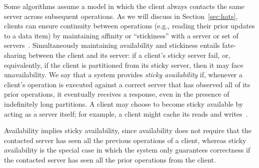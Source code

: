 Some algorithms assume a model in which the client always contacts the
same server across subsequent operations. As we will discuss in
Section~\ref{sec:hats}, clients can ensure continuity between
operations (e.g., reading their prior updates to a data item) by
maintaining affinity or ``stickiness'' with a server or set of
servers~\cite{vogels-defs}. Simultaneously maintaining availability
and stickiness entails fate-sharing between the client and its 
server: if a client's sticky server fail, or, equivalently, if the
client is partitioned from its sticky server, then it may face
unavailability. We say that a system provides \textit{sticky
  availability} if, whenever a client's operation is executed against
a correct server that has observed all of its prior operations, it eventually
receives a response, even in the presence of indefinitely long
partitions. A client may choose to become sticky available by acting
as a server itself; for example, a client might cache its reads and
writes~\cite{bolton, sessionguarantees, swift}. 

Availability implies sticky availability, since availability does not
require that the contacted server has seen all the previous operations
of a client, whereas sticky availability is the special case in which
the system only guarantees correctness if the contacted server has
seen all the prior operations from the client.




